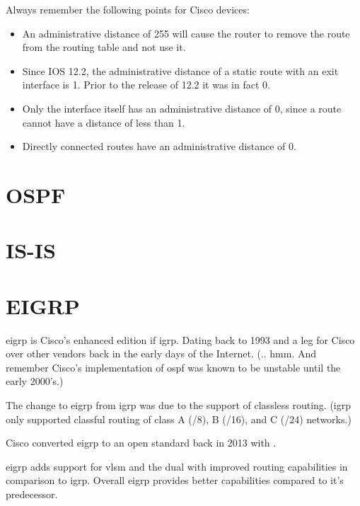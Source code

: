 Always remember the following points for Cisco devices:\cite{wiki:Administrative_distance}
\begin{itemize}
    \item An administrative distance of 255 will cause the router to remove the route from the routing table and not use it.
    \item Since IOS 12.2, the administrative distance of a static route with an exit interface is 1. Prior to the release of 12.2 it was in fact 0.
    \item Only the interface itself has an administrative distance of 0, since a route cannot have a distance of less than 1.
    \item Directly connected routes have an administrative distance of 0.
\end{itemize}

\newpage

\section{OSPF}

\newpage

\section{IS-IS}

\newpage

\section{EIGRP}

\gls{eigrp} is Cisco's enhanced edition if \gls{igrp}. Dating back to 1993 and a leg for Cisco over other vendors back in the early days of the Internet. (.. hmm. And remember Cisco's implementation of \gls{ospf} was known to be unstable until the early 2000's.)

The change to \gls{eigrp} from \gls{igrp} was due to the support of classless routing. (\gls{igrp} only supported classful routing of class A (/8), B (/16), and C (/24) networks.)

Cisco converted \gls{eigrp} to an open standard back in 2013 with .\cite{wiki:Enhanced_Interior_Gateway_Routing_Protocol}

\gls{eigrp} adds support for \gls{vlsm} and the \gls{dual} with improved routing capabilities in comparison to \gls{igrp}. Overall \gls{eigrp} provides better capabilities compared to it's predecessor.

